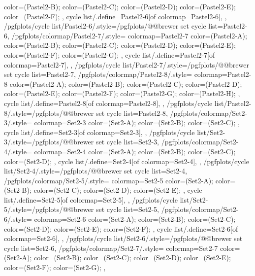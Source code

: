 {{{      color=(Pastel2-B);
      color=(Pastel2-C);
      color=(Pastel2-D);
      color=(Pastel2-E);
      color=(Pastel2-F);
    },
    cycle list/.define={Pastel2-6}{[of colormap=Pastel2-6]},
  },
  /pgfplots/cycle list/Pastel2-6/.style={/pgfplots/@@brewer set cycle list={Pastel2-6}},
  /pgfplots/colormap/Pastel2-7/.style={
    colormap={Pastel2-7}{
      color=(Pastel2-A);
      color=(Pastel2-B);
      color=(Pastel2-C);
      color=(Pastel2-D);
      color=(Pastel2-E);
      color=(Pastel2-F);
      color=(Pastel2-G);
    },
    cycle list/.define={Pastel2-7}{[of colormap=Pastel2-7]},
  },
  /pgfplots/cycle list/Pastel2-7/.style={/pgfplots/@@brewer set cycle list={Pastel2-7}},
  /pgfplots/colormap/Pastel2-8/.style={
    colormap={Pastel2-8}{
      color=(Pastel2-A);
      color=(Pastel2-B);
      color=(Pastel2-C);
      color=(Pastel2-D);
      color=(Pastel2-E);
      color=(Pastel2-F);
      color=(Pastel2-G);
      color=(Pastel2-H);
    },
    cycle list/.define={Pastel2-8}{[of colormap=Pastel2-8]},
  },
  /pgfplots/cycle list/Pastel2-8/.style={/pgfplots/@@brewer set cycle list={Pastel2-8}},
  /pgfplots/colormap/Set2-3/.style={
    colormap={Set2-3}{
      color=(Set2-A);
      color=(Set2-B);
      color=(Set2-C);
    },
    cycle list/.define={Set2-3}{[of colormap=Set2-3]},
  },
  /pgfplots/cycle list/Set2-3/.style={/pgfplots/@@brewer set cycle list={Set2-3}},
  /pgfplots/colormap/Set2-4/.style={
    colormap={Set2-4}{
      color=(Set2-A);
      color=(Set2-B);
      color=(Set2-C);
      color=(Set2-D);
    },
    cycle list/.define={Set2-4}{[of colormap=Set2-4]},
  },
  /pgfplots/cycle list/Set2-4/.style={/pgfplots/@@brewer set cycle list={Set2-4}},
  /pgfplots/colormap/Set2-5/.style={
    colormap={Set2-5}{
      color=(Set2-A);
      color=(Set2-B);
      color=(Set2-C);
      color=(Set2-D);
      color=(Set2-E);
    },
    cycle list/.define={Set2-5}{[of colormap=Set2-5]},
  },
  /pgfplots/cycle list/Set2-5/.style={/pgfplots/@@brewer set cycle list={Set2-5}},
  /pgfplots/colormap/Set2-6/.style={
    colormap={Set2-6}{
      color=(Set2-A);
      color=(Set2-B);
      color=(Set2-C);
      color=(Set2-D);
      color=(Set2-E);
      color=(Set2-F);
    },
    cycle list/.define={Set2-6}{[of colormap=Set2-6]},
  },
  /pgfplots/cycle list/Set2-6/.style={/pgfplots/@@brewer set cycle list={Set2-6}},
  /pgfplots/colormap/Set2-7/.style={
    colormap={Set2-7}{
      color=(Set2-A);
      color=(Set2-B);
      color=(Set2-C);
      color=(Set2-D);
      color=(Set2-E);
      color=(Set2-F);
      color=(Set2-G);
    },
}}
